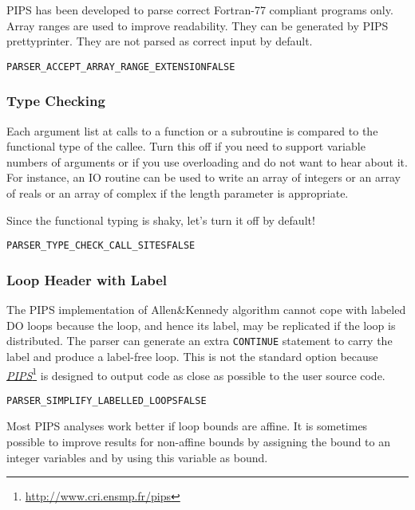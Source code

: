 \documentclass[a4paper]{report}
\newenvironment{PipsProp}{\begin{alltt}}{\end{alltt}}
\newcommand{\LINK}[2]{\href{#2}{#1}\footnote{\url{#2}}\xspace}
\newcommand{\PIPS}{\LINK{\emph{PIPS}}{http://www.cri.ensmp.fr/pips}}
\begin{document}
PIPS has been developed to parse correct Fortran-77 compliant programs
only. Array ranges are used to improve readability. They can be generated
by PIPS prettyprinter. They are not parsed as correct input by default.

\begin{PipsProp}
PARSER_ACCEPT_ARRAY_RANGE_EXTENSION FALSE
\end{PipsProp}

\subsubsection*{Type Checking}

Each argument list at calls to a function or a subroutine is compared to
the functional type of the callee. Turn this off if you need to support
variable numbers of arguments or if you use overloading and do not want to
hear about it. For instance, an IO routine can be used to write an array
of integers or an array of reals or an array of complex if the length
parameter is appropriate.

Since the functional typing is shaky, let's turn it off by default!

\begin{PipsProp}
PARSER_TYPE_CHECK_CALL_SITES   FALSE
\end{PipsProp}

\subsubsection*{Loop Header with Label}

The PIPS implementation of Allen\&Kennedy algorithm cannot cope with
labeled DO loops because the loop, and hence its label, may be
replicated if the loop is distributed. The parser can generate an extra
\verb/CONTINUE/ statement to carry the label and produce a label-free
loop. This is not the standard option because \PIPS{} is designed to
output code as close as possible to the user source code.

\begin{PipsProp}
PARSER_SIMPLIFY_LABELLED_LOOPS FALSE
\end{PipsProp}

Most PIPS analyses work better if loop bounds are affine. It is sometimes
possible to improve results for non-affine bounds by assigning the bound
to an integer variables and by using this variable as bound.
\end{document}
